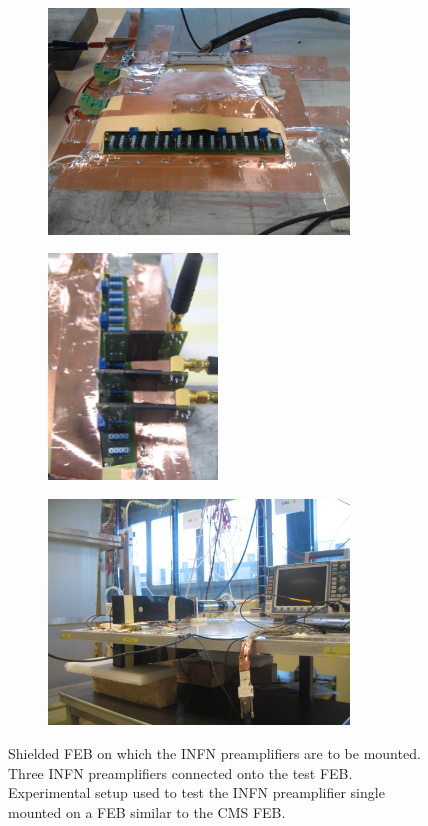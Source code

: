 	\begin{figure}[H]
		\begin{subfigure}{.6\linewidth}
		    \centering
			\includegraphics[height = 6cm]{fig/chapt6/ATLAS_FEB.png}
			\caption{\label{fig:Setup-INFN-904:A}}
		\end{subfigure}
		\begin{subfigure}{.4\linewidth}
		    \centering
			\includegraphics[height = 6cm]{fig/chapt6/ATLAS_preamp.JPG}
			\caption{\label{fig:Setup-INFN-904:B}}
		\end{subfigure}
		\begin{subfigure}{\linewidth}
		    \centering
			\includegraphics[height = 6cm]{fig/chapt6/Setup_ATLAS_PAK.JPG}
			\caption{\label{fig:Setup-INFN-904:C}}
		\end{subfigure}
		\caption{\label{fig:Setup-INFN-904}  Shielded \acl{FEB} on which the INFN preamplifiers are to be mounted.  Three INFN preamplifiers connected onto the test FEB.  Experimental setup used to test the INFN preamplifier single mounted on a FEB similar to the CMS FEB.}
    \end{figure}
	
